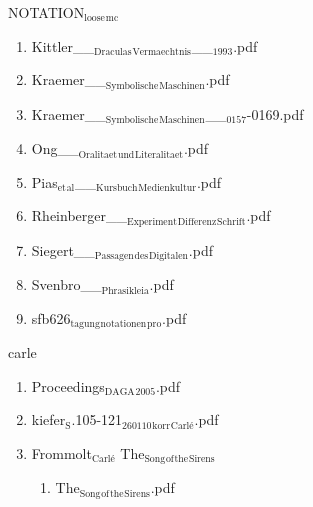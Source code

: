 \documentclass[11pt]{article}
\begin{document}

\item NOTATION$_{\text{loose}}$$_{\text{mc}}$
\label{sec-1-1-1-1-11-24-36}
\begin{enumerate}
\item Kittler\_\_$_{\text{Draculas}}$$_{\text{Vermaechtnis}}$\_\_$_{\text{1993}}$.pdf
\label{sec-1-1-1-1-11-24-36-1}

\item Kraemer\_\_$_{\text{Symbolische}}$$_{\text{Maschinen}}$.pdf
\label{sec-1-1-1-1-11-24-36-2}

\item Kraemer\_\_$_{\text{Symbolische}}$$_{\text{Maschinen}}$\_\_$_{\text{0157}}$-0169.pdf
\label{sec-1-1-1-1-11-24-36-3}

\item Ong\_\_$_{\text{Oralitaet}}$$_{\text{und}}$$_{\text{Literalitaet}}$.pdf
\label{sec-1-1-1-1-11-24-36-4}

\item Pias$_{\text{et}}$$_{\text{al}}$\_\_$_{\text{Kursbuch}}$$_{\text{Medienkultur}}$.pdf
\label{sec-1-1-1-1-11-24-36-5}

\item Rheinberger\_\_$_{\text{Experiment}}$$_{\text{Differenz}}$$_{\text{Schrift}}$.pdf
\label{sec-1-1-1-1-11-24-36-6}

\item Siegert\_\_$_{\text{Passagen}}$$_{\text{des}}$$_{\text{Digitalen}}$.pdf
\label{sec-1-1-1-1-11-24-36-7}

\item Svenbro\_\_$_{\text{Phrasikleia}}$.pdf
\label{sec-1-1-1-1-11-24-36-8}

\item sfb626$_{\text{tagung}}$$_{\text{notationen}}$$_{\text{pro}}$.pdf
\label{sec-1-1-1-1-11-24-36-9}
\end{enumerate}

\item carle
\label{sec-1-1-1-1-11-24-37}
\begin{enumerate}
\item Proceedings$_{\text{DAGA}}$$_{\text{2005}}$.pdf
\label{sec-1-1-1-1-11-24-37-1}

\item kiefer$_{\text{S}}$.105-121$_{\text{260110}}$$_{\text{korr}}$$_{\text{Carlé}}$.pdf
\label{sec-1-1-1-1-11-24-37-2}

\item Frommolt$_{\text{Carlé}}$ The$_{\text{Song}}$$_{\text{of}}$$_{\text{the}}$$_{\text{Sirens}}$
\label{sec-1-1-1-1-11-24-37-3}
\begin{enumerate}
\item The$_{\text{Song}}$$_{\text{of}}$$_{\text{the}}$$_{\text{Sirens}}$.pdf
\label{sec-1-1-1-1-11-24-37-3-1}
\end{enumerate}
\end{enumerate}
\end{document}
